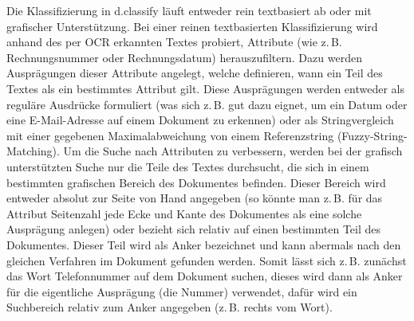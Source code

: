 \documentclass{whswinvcbook}
\begin{document}
Die Klassifizierung in d.classify läuft entweder rein textbasiert ab oder mit grafischer Unterstützung. Bei einer reinen textbasierten Klassifizierung wird anhand des per OCR erkannten Textes probiert, Attribute (wie z.\,B. Rechnungsnummer oder Rechnungsdatum) herauszufiltern. Dazu werden Ausprägungen dieser Attribute angelegt, welche definieren, wann ein Teil des Textes als ein bestimmtes Attribut gilt. Diese Ausprägungen werden entweder als reguläre Ausdrücke formuliert (was sich z.\,B. gut dazu eignet, um ein Datum oder eine E-Mail-Adresse auf einem Dokument zu erkennen) oder als Stringvergleich mit einer gegebenen Maximalabweichung von einem Referenzstring (Fuzzy-String-Matching). Um die Suche nach Attributen zu verbessern, werden bei der grafisch unterstützten Suche nur die Teile des Textes durchsucht, die sich in einem bestimmten grafischen Bereich des Dokumentes befinden. Dieser Bereich wird entweder absolut zur Seite von Hand angegeben (so könnte man z.\,B. für das Attribut Seitenzahl jede Ecke und Kante des Dokumentes als eine solche Ausprägung anlegen) oder bezieht sich relativ auf einen bestimmten Teil des Dokumentes. Dieser Teil wird als Anker bezeichnet und kann abermals nach den gleichen Verfahren im Dokument gefunden werden. Somit lässt sich z.\,B. zunächst das Wort Telefonnummer auf dem Dokument suchen, dieses wird dann als Anker für die eigentliche Ausprägung (die Nummer) verwendet, dafür wird ein Suchbereich relativ zum Anker angegeben (z.\,B. rechts vom Wort).
\end{document}
